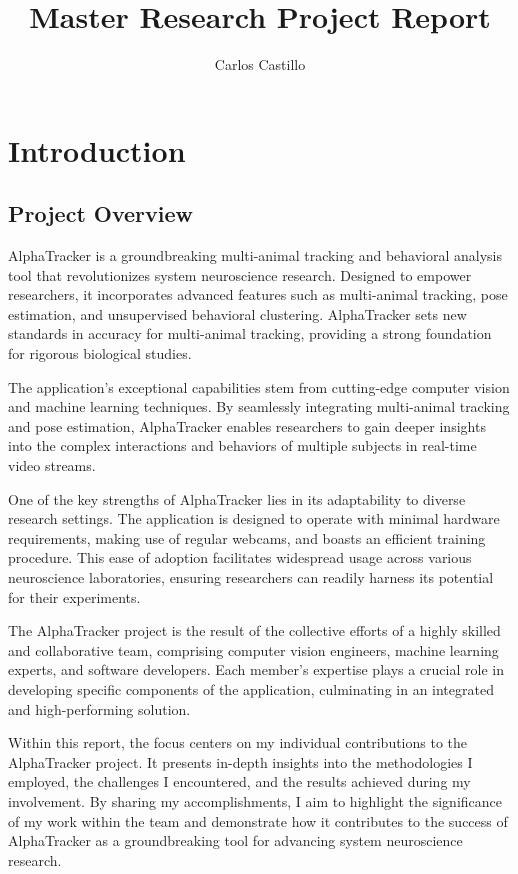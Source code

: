 \documentclass[
  11pt,
]{article}
\title{Master Research Project Report}
\author{Carlos Castillo}
\date{}
\begin{document}
\maketitle

\pagebreak
\tableofcontents
\pagebreak

\hypertarget{introduction}{%
\section{Introduction}\label{introduction}}

\hypertarget{project-overview}{%
\subsection{Project Overview}\label{project-overview}}

AlphaTracker is a groundbreaking multi-animal tracking and behavioral
analysis tool that revolutionizes system neuroscience research. Designed
to empower researchers, it incorporates advanced features such as
multi-animal tracking, pose estimation, and unsupervised behavioral
clustering. AlphaTracker sets new standards in accuracy for multi-animal
tracking, providing a strong foundation for rigorous biological studies.

The application's exceptional capabilities stem from cutting-edge
computer vision and machine learning techniques. By seamlessly
integrating multi-animal tracking and pose estimation, AlphaTracker
enables researchers to gain deeper insights into the complex
interactions and behaviors of multiple subjects in real-time video
streams.

One of the key strengths of AlphaTracker lies in its adaptability to
diverse research settings. The application is designed to operate with
minimal hardware requirements, making use of regular webcams, and boasts
an efficient training procedure. This ease of adoption facilitates
widespread usage across various neuroscience laboratories, ensuring
researchers can readily harness its potential for their experiments.

The AlphaTracker project is the result of the collective efforts of a
highly skilled and collaborative team, comprising computer vision
engineers, machine learning experts, and software developers. Each
member's expertise plays a crucial role in developing specific
components of the application, culminating in an integrated and
high-performing solution.

Within this report, the focus centers on my individual contributions to
the AlphaTracker project. It presents in-depth insights into the
methodologies I employed, the challenges I encountered, and the results
achieved during my involvement. By sharing my accomplishments, I aim to
highlight the significance of my work within the team and demonstrate
how it contributes to the success of AlphaTracker as a groundbreaking
tool for advancing system neuroscience research.
\end{document}
